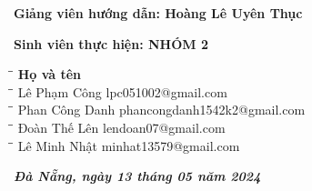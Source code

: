 \documentclass[a4paper]{article}
\begin{document}
\begin{titlepage}
\vspace{50pt}
\begin{addmargin}[1cm]{0cm}
\textbf{Giảng viên hướng dẫn: \hspace{2cm}Hoàng Lê Uyên Thục}
\end{addmargin}
\vspace{10pt}
\begin{addmargin}[1cm]{0cm}
\textbf{Sinh viên thực hiện: \hspace{2.6cm}NHÓM 2}
\begin{tabbing}
\hspace{4cm}\=\hspace{3cm}\=\hspace{5cm} \kill
{\textbf{Họ và tên}}\\
\hspace{4cm}\=\hspace{3cm}\=\hspace{5cm} \kill
Lê Phạm Công\> lpc051002@gmail.com\\
\hspace{4cm}\=\hspace{3cm}\=\hspace{5cm} \kill
Phan Công Danh\> phancongdanh1542k2@gmail.com\\
\hspace{4cm}\=\hspace{3cm}\=\hspace{5cm} \kill
Đoàn Thế Lên\> lendoan07@gmail.com\\
\hspace{4cm}\=\hspace{3cm}\=\hspace{5cm} \kill
Lê Minh Nhật\> minhat13579@gmail.com\\
\end{tabbing}
\end{addmargin}
\vspace{1cm}
\begin{center}
    \textit{\textbf{Đà Nẵng, ngày 13 tháng 05 năm 2024}}
\end{center}
\end{titlepage}
\newpage
\tableofcontents
\newpage

\end{document}
